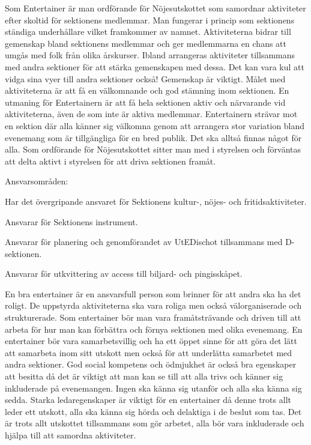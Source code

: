 \documentclass[10pt]{article}
\def\post{Entertainer}
\def\doctitle{Kravprofil för \post}
\begin{document}
\heading{\doctitle}


Som {\post} är man ordförande för Nöjesutskottet som samordnar aktiviteter efter skoltid för sektionens medlemmar. Man fungerar i princip som sektionens ständiga underhållare vilket framkommer av namnet. Aktiviteterna bidrar till gemenskap bland sektionens medlemmar och ger medlemmarna en chans att umgås med folk från olika årskurser. Ibland arrangeras aktiviteter tillsammans med andra sektioner för att stärka gemenskapen med dessa. Det kan vara kul att vidga sina vyer till andra sektioner också! Gemenskap är viktigt. Målet med aktiviteterna är att få en välkomnande och god stämning inom sektionen. En utmaning för Entertainern är att få hela sektionen aktiv och närvarande vid aktiviteterna, även de som inte är aktiva medlemmar. Entertainern strävar mot en sektion där alla känner sig välkomna genom att arrangera stor variation bland evenemang som är tillgängliga för en bred publik. Det ska alltså finnas något för alla.  Som ordförande för Nöjesutskottet sitter man med i styrelsen och förväntas att delta aktivt i styrelsen för att driva sektionen framåt.


Ansvarsområden:
\begin{dashlist}
    \item Har det övergripande ansvaret för Sektionens kultur-, nöjes- och fritidsaktiviteter.
    \item Ansvarar för Sektionens instrument.
    \item Ansvarar för planering och genomförandet av UtEDischot tillsammans med D-sektionen.
    \item Ansvarar för utkvittering av access till biljard- och pingisskåpet.
\end{dashlist}


En bra entertainer är en ansvarsfull person som brinner för att andra ska ha det roligt. De uppstyrda aktiviteterna ska vara roliga men också välorganiserade och strukturerade. Som entertainer bör man vara framåtsträvande och driven till att arbeta för hur man kan förbättra och förnya sektionen med olika evenemang.  En entertainer bör vara samarbetsvillig och ha ett öppet sinne för att göra det lätt att samarbeta inom sitt utskott men också för att underlätta samarbetet med andra sektioner. God social kompetens och ödmjukhet är också bra egenskaper att besitta då det är viktigt att man kan se till att alla trivs och känner sig inkluderade på evenemangen. Ingen ska känna sig utanför och alla ska känna sig sedda. Starka ledaregenskaper är viktigt för en entertainer då denne trots allt leder ett utskott, alla ska känna sig hörda och delaktiga i de beslut som tas. Det är trots allt utskottet tillsammans som gör arbetet, alla bör vara inkluderade och hjälpa till att samordna aktiviteter. 
\end{document}
